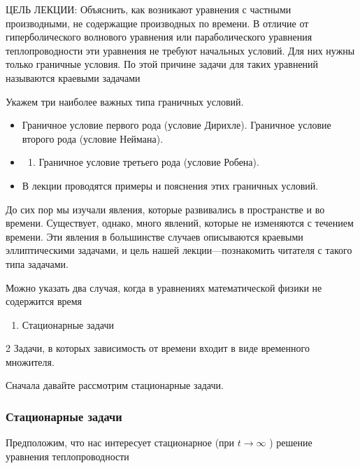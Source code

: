 \documentclass[
  ukrainian,
]{article}
\providecommand{\tightlist}{%
  \setlength{\itemsep}{0pt}\setlength{\parskip}{0pt}}
\begin{document}
ЦЕЛЬ ЛЕКЦИИ: Объяснить, как возникают уравнения с частными производными,
не содержащие производных по времени. В отличие от гиперболического
волнового уравнения или параболического уравнения теплопроводности эти
уравнения не требуют начальных условий. Для них нужны только граничные
условия. По этой причине задачи для таких уравнений называются краевыми
задачами

Укажем три наиболее важных типа граничных условий.

\begin{itemize}
\tightlist
\item
  Граничное условие первого рода (условие Дирихле). Граничное условие
  второго рода (условие Неймана).
\item
  \begin{enumerate}
  \def\labelenumi{\arabic{enumi}.}
  \setcounter{enumi}{2}
  \tightlist
  \item
    Граничное условие третьего рода (условие Робена).
  \end{enumerate}
\item
  В лекции проводятся примеры и пояснения этих граничных условий.
\end{itemize}

До сих пор мы изучали явления, которые развивались в пространстве и во
времени. Существует, однако, много явлений, которые не изменяются с
течением времени. Эти явления в большинстве случаев описываются краевыми
эллиптическими задачами, и цель нашей лекции---познакомить читателя с
такого типа задачами.

Можно указать два случая, когда в уравнениях математической физики не
содержится время

\begin{enumerate}
\def\labelenumi{\arabic{enumi}.}
\tightlist
\item
  Стационарные задачи
\end{enumerate}

2 Задачи, в которых зависимость от времени входит в виде временного
множителя.

Сначала давайте рассмотрим стационарные задачи.

\subsubsection{Стационарные
задачи}\label{ux441ux442ux430ux446ux438ux43eux43dux430ux440ux43dux44bux435-ux437ux430ux434ux430ux447ux438}

Предположим, что нас интересует стационарное (при \(t \to \infty\) )
решение уравнения теплопроводности
\end{document}
